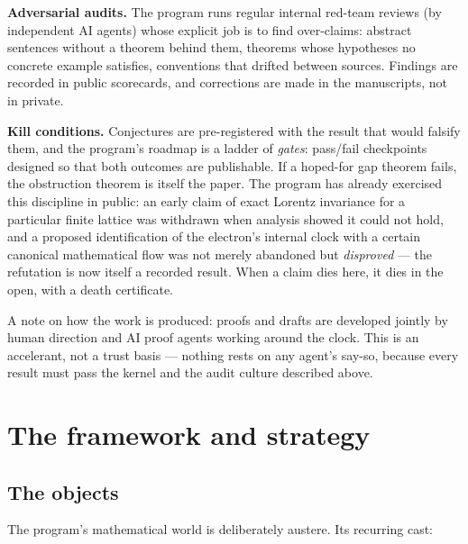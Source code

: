 \documentclass[11pt]{article}
\begin{document}
\textbf{Adversarial audits.}  The program runs regular internal red-team
reviews (by independent AI agents) whose explicit job is to
find over-claims: abstract sentences without a theorem behind them,
theorems whose hypotheses no concrete example satisfies, conventions that
drifted between sources.  Findings are recorded in public scorecards, and
corrections are made in the manuscripts, not in private.

\textbf{Kill conditions.}  Conjectures are pre-registered with the result
that would falsify them, and the program's roadmap is a ladder of
\emph{gates}: pass/fail checkpoints designed so that both outcomes are
publishable.  If a hoped-for gap theorem fails, the obstruction theorem is
itself the paper.  The program has already exercised this discipline in
public: an early claim of exact Lorentz invariance for a particular finite
lattice was withdrawn when analysis showed it could not hold, and a
proposed identification of the electron's internal clock with a certain
canonical mathematical flow was not merely abandoned but \emph{disproved}
--- the refutation is now itself a recorded result.  When a claim dies
here, it dies in the open, with a death certificate.

A note on how the work is produced: proofs and drafts are developed
jointly by human direction and AI proof agents working around the clock.
This is an accelerant, not a trust basis --- nothing rests on any agent's
say-so, because every result must pass the kernel and the audit culture
described above.

\section{The framework and strategy}\label{sec:framework}

\subsection{The objects}

The program's mathematical world is deliberately austere.  Its recurring
cast:
\end{document}
